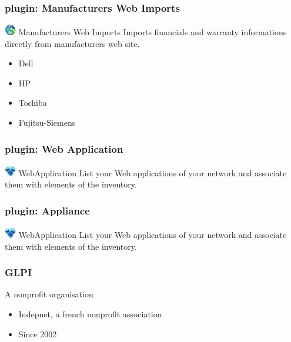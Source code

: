 \documentclass{beamer}
\begin{document}
\begin{frame}
    \frametitle{plugin: Manufacturers Web Imports}
    
    \begin{block}{\includegraphics[height=0.5cm]{./pics/plugins/manufacturer.jpg} Manufacturers Web Imports}
        Imports financials and warranty informations directly from manufacturers web site.
        \begin{itemize}
            \item Dell 
            \item HP
            \item Toshiba
            \item Fujitsu-Siemens 
        \end{itemize}
    \end{block}

\end{frame}

\begin{frame}
    \frametitle{plugin: Web Application}
    
    \begin{block}{\includegraphics[height=0.5cm]{./pics/plugins/webapp.jpg} WebApplication}
        List your Web applications of your network and associate them with elements of the inventory.
    \end{block}

\end{frame}


\begin{frame}
    \frametitle{plugin: Appliance}
    
    \begin{block}{\includegraphics[height=0.5cm]{./pics/plugins/webapp.jpg} WebApplication}
        List your Web applications of your network and associate them with elements of the inventory.
    \end{block}

\end{frame}

\begin{frame}

    \frametitle{GLPI}

    \begin{block}{A nonprofit organisation}
        \begin{itemize}
            \item Indepnet, a french nonprofit association
            \item Since 2002
        \end{itemize}
    \end{block}

\end{frame}
\end{document}
